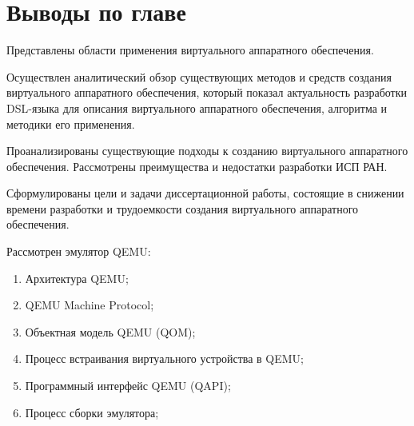 \section*{Выводы по главе}\label{sec:ch1/sec5}

Представлены области применения виртуального аппаратного
обеспечения.

Осуществлен аналитический обзор существующих методов и средств
создания виртуального аппаратного обеспечения, который показал
актуальность разработки DSL-языка для описания виртуального аппаратного
обеспечения, алгоритма и методики его применения.

Проанализированы существующие подходы к созданию виртуального
аппаратного обеспечения. Рассмотрены преимущества и недостатки
разработки ИСП РАН.

Сформулированы цели и задачи диссертационной работы, состоящие в
снижении времени разработки и трудоемкости создания виртуального
аппаратного обеспечения.

Рассмотрен эмулятор QEMU:
\begin{enumerate}[label={\arabic*)}]
    \item Архитектура QEMU;
    \item QEMU Machine Protocol;
    \item Объектная модель QEMU (QOM);
    \item Процесс встраивания виртуального устройства в QEMU;
    \item Программный интерфейс QEMU (QAPI);
    \item Процесс сборки эмулятора;
\end{enumerate}

